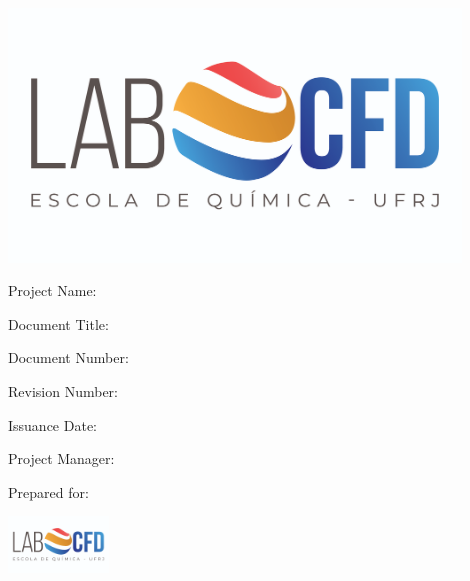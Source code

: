 \begin{titlepage}
\vspace*{2.5cm}
    \hspace*{-1cm} \includegraphics[width=0.9\textwidth]{images/LabCfdTitle}
    
        \vspace*{1cm}
            
            
  
    \noindent \Large Project Name:    \ProjectName 
    
    
    \noindent \Large Document Title:  \DocumentTitle  
    
    \noindent \Large Document Number: \DocumentNumber 
    
    \noindent \Large Revision Number: \RevisionNumber 
    
    \noindent \Large Issuance Date:   \IssuanceDate

    \noindent \Large Project Manager: \ProjectManager
            
        \vspace*{3cm}
        
        \begin{center}
         \huge
\hspace*{-2.6cm}         Prepared for:

         \vspace*{1cm}
         
 \hspace*{-2.6cm}        \includegraphics[width=0.2\textwidth]{images/LabCfdTitle}
        \end{center}

            
\end{titlepage}
